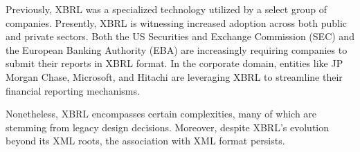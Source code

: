 Previously, XBRL was a specialized technology utilized by a select group of companies.
Presently, XBRL is witnessing increased adoption across both public and private sectors.
Both the US Securities and Exchange Commission (SEC)\cite{sec_ixbrl} and the European Banking Authority (EBA)\cite{eba_reporting_frameworks} are increasingly requiring companies to submit their reports in XBRL format.
In the corporate domain, entities like JP Morgan Chase, Microsoft, and Hitachi are leveraging XBRL to streamline their financial reporting mechanisms.\cite{pwc2002thejournal}

Nonetheless, XBRL encompasses certain complexities,
many of which are stemming from legacy design decisions.
Moreover, despite XBRL's evolution beyond its XML roots,
the association with XML format persists.

